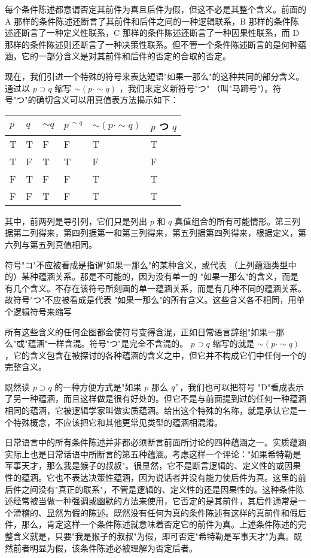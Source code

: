 每个条件陈述都意谓否定其前件为真且后件为假，但这不必是其整个含义。前面的 A 那样的条件陈述还断言了其前件和后件之间的一种逻辑联系，B 那样的条件陈述还断言了一种定义性联系，C 那样的条件陈述还断言了一种因果性联系，而 D 那样的条件陈述则还断言了一种决策性联系。但不管一个条件陈述断言的是何种蕴涵，它的一部分含义是对其前件和后件的否定的合取的否定。

现在，我们引进一个特殊的符号来表达短语"如果一那么"的这种共同的部分含义。通过以 $p \supset q$ 缩写 $\sim(p \cdot \sim q)$ ，我们来定义新符号"つ" （叫"马蹄号"）。符号"つ"的确切含义可以用真值表方法揭示如下：

\begin{center}
\begin{tabular}{|l|l|l|l|l|l|}
\hline
$p$ & $q$ & $\sim q$ & $p^{\cdot \sim q}$ & $\sim(p \cdot \sim q)$ & $p$ つ $q$ \\
\hline
T & T & F & F & T & T \\
\hline
T & F & T & T & F & F \\
\hline
F & T & F & F & T & T \\
\hline
F & F & T & F & T & T \\
\hline
\end{tabular}
\end{center}

其中，前两列是导引列，它们只是列出 $p$ 和 $q$ 真值组合的所有可能情形。第三列据第二列得来，第四列据第一和第三列得来，第五列据第四列得来，根据定义，第六列与第五列真值相同。

符号"コ"不应被看成是指谓"如果一那么"的某种含义，或代表 （上列蕴涵类型中的）某种蕴涵关系。那是不可能的，因为没有单一的 "如果一那么"的含义，而是有几个含义。不存在该符号所刻画的单一蕴涵关系，而是有几种不同的蕴涵关系。故符号"つ"不应被看成是代表 "如果一那么"的所有含义。这些含义各不相同，用单个逻辑符号来缩写

所有这些含义的任何企图都会使符号变得含混，正如日常语言辞组"如果一那么"或"蕴涵"一样含混。符号"つ"是完全不含混的。 $p \supset q$ 缩写的就是 $\sim(p \cdot \sim q)$ ，它的含义包含在被探讨的各种蕴涵的含义之中，但它并不构成它们中任何一个的完整含义。

既然读 $p \supset q$ 的一种方便方式是"如果 $p$ 那么 $q"$，我们也可以把符号 "D"看成表示了另一种蕴涵，而且这样做是很有好处的。但它不是与前面提到过的任何一种蕴涵相同的蕴涵，它被逻辑学家叫做实质蕴涵。给出这个特殊的名称，就是承认它是一个特殊概念，不应该把它和其他更常见类型的蕴涵相混淆。

日常语言中的所有条件陈述并非都必须断言前面所讨论的四种蕴涵之一。实质蕴涵实际上也是日常话语中所断言的第五种蕴涵。考虑这样一个评论："如果希特勒是军事天才，那么我是猴子的叔叔"。很显然，它不是断言逻辑的、定义性的或因果性的蕴涵。它也不表达决策性蕴涵，因为说话者并没有能力使后件为真。这里的前后件之间没有"真正的联系"，不管是逻辑的、定义性的还是因果性的。这种条件陈述经常被当做一种强调或幽默的方法来使用，它否定的是其前件，其后件通常是一个滑稽的、显然为假的陈述。既然没有任何为真的条件陈述有这样的真前件和假后件，那么，肯定这样一个条件陈述就意味着否定它的前件为真。上述条件陈述的完整含义就是，只要"我是猴子的叔叔"为假，即可否定"希特勒是军事天才"为真。既然前者明显为假，该条件陈述必被理解为否定后者。


